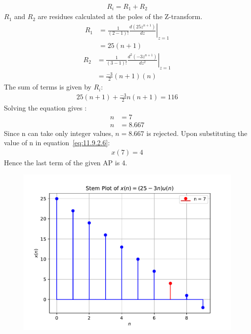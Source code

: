 \documentclass[journal,12pt,twocolumn]{IEEEtran}
\theoremstyle{remark}
\begin{document}
\begin{align}
	R_i=R_1 + R_2
\end{align}
 $R_1$ and $R_2$ are residues calculated at the poles of the Z-transform.
\begin{align}
		R_1 &= \frac{1}{{(2-1)!}} \left. \frac{d (25z^{n+1})}{dz} \right|_{z=1} \\
	&=25(n+1)
\end{align}
\begin{align}
	R_2 &= \frac{1}{{(3-1)!}} \left. \frac{d^2(-3z^{n+1})}{dz^2} \right|_{z=1} \\
	&= \frac{-3}{2}(n+1)(n)
\end{align}
The sum of terms is given by $R_i$:
 \begin{align}
25(n+1)	+ \frac{-3}{2} n(n+1) = 116 
 \end{align}
Solving the equation gives :
\begin{align}
	n&=7\\ n&=8.667
\end{align}
Since n can take only integer values, $n=8.667$ is rejected. 
Upon substituting the value of n in equation~\eqref{eq:11.9.2.6}:
\begin{align}
	x(7)=4
\end{align}
Hence the last term of the given AP is 4.
\begin{figure}[h!]
    \centering
    \includegraphics[width=\columnwidth]{ncert-maths/11/9/2/6/figs/stem_plot.pdf}
\end{figure}
\end{document}
